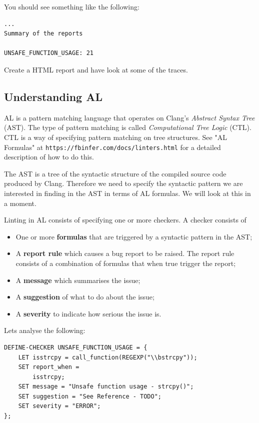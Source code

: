 You should see something like the following:

\begin{verbatim}
...
Summary of the reports

UNSAFE_FUNCTION_USAGE: 21
\end{verbatim}

Create a HTML report and have look at some of the traces.

\subsection{Understanding AL}

AL is a pattern matching language that operates on Clang's \textit{Abstract Syntax Tree} (AST).
The type of pattern matching is called \textit{Computational Tree Logic} (CTL).
CTL is a way of specifying pattern matching on tree structures. 
See "AL Formulas" at \verb|https://fbinfer.com/docs/linters.html| for a detailed 
description of how to do this.

The AST is a tree of the syntactic structure of the compiled source code produced by Clang.
Therefore we need to specify the syntactic pattern we are interested in finding in the AST
in terms of AL formulas. We will look at this in a moment.

Linting in AL consists of specifying one or more checkers. 
A checker consists of
\begin{itemize}
	\item One or more \textbf{formulas} that are triggered by a syntactic pattern in the AST;
	\item A \textbf{report rule} which causes a bug report to be raised. 
	The report rule consists of a combination of formulas that when true trigger the report;
	\item A \textbf{message} which summarises the issue;
	\item A \textbf{suggestion} of what to do about the issue;
	\item A \textbf{severity} to indicate how serious the issue is.
\end{itemize}

Lets analyse the following:

\begin{verbatim}
DEFINE-CHECKER UNSAFE_FUNCTION_USAGE = {
	LET isstrcpy = call_function(REGEXP("\\bstrcpy"));
	SET report_when =
		isstrcpy;
	SET message = "Unsafe function usage - strcpy()";
	SET suggestion = "See Reference - TODO";
	SET severity = "ERROR";
};
\end{verbatim}

